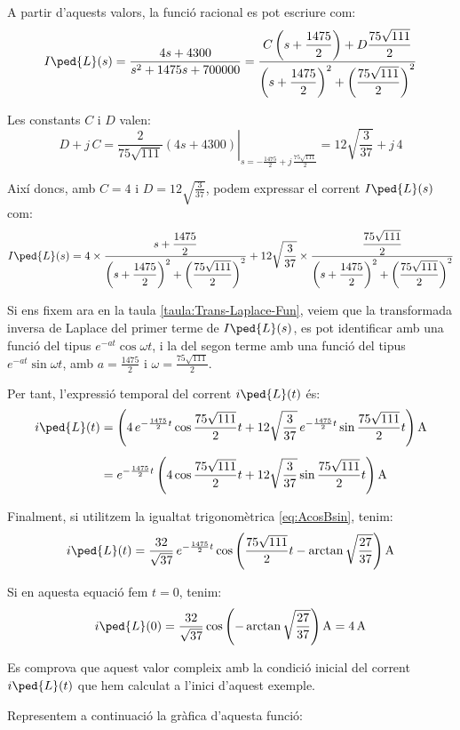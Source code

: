 \begin{exemple}
    A partir d'aquests valors, la  funció racional es pot escriure com:
    \[
        I\ped{L}(s) =
        \frac{4 s+ 4300}{s^2 +1475 s + 700000} =
        \frac{C\left(s+\dfrac{1475}{2}\right)+D\dfrac{75\sqrt{111}}{2}}
        {\left(s+\dfrac{1475}{2}\right)^2+\left(\dfrac{75\sqrt{111}}{2}\right)^2}
    \]

    Les constants $C$ i $D$ valen:
    \[
    D + j\,C = \left.\frac{2}{75\sqrt{111}}(4 s
    +4300)\right|_{s=-\frac{1475}{2} + j\,\frac{75\sqrt{111}}{2}}=
    12\sqrt{\frac{3}{37}} +j\,4
    \]

    Així doncs, amb $C=4$ i $D=12\sqrt{\frac{3}{37}}$, podem expressar
    el corrent $I\ped{L}(s)$ com:
    \[
        I\ped{L}(s) = 4\times\frac{s+\dfrac{1475}{2}}
        {\left(s+\dfrac{1475}{2}\right)^2+\left(\dfrac{75\sqrt{111}}{2}\right)^2}
        + 12\sqrt{\frac{3}{37}}\times\frac{\dfrac{75\sqrt{111}}{2}}
        {\left(s+\dfrac{1475}{2}\right)^2+\left(\dfrac{75\sqrt{111}}{2}\right)^2}
    \]


     Si ens fixem ara en la taula \vref{taula:Trans-Laplace-Fun},
    veiem que la transformada inversa de Laplace del primer terme de
    $I\ped{L}(s)$, es pot identificar amb una funció del tipus
    $e^{-at}\cos\omega t$, i la del segon terme amb una funció del tipus
    $e^{-at}\sin\omega t$, amb $a=\frac{1475}{2}$ i
    $\omega=\frac{75\sqrt{111}}{2}$.

    Per tant, l'expressió temporal del corrent $i\ped{L}(t)$ és:
    \[\begin{split}
        i\ped{L}(t) &= \left( 4\, e^{-\frac{1475}{2}t} \cos \frac{75\sqrt{111}}{2} t +
        12\sqrt{\frac{3}{37}}\, e^{-\frac{1475}{2}t} \sin
        \frac{75\sqrt{111}}{2}t \right) \unit{A} \\[1ex] 
        &= e^{-\frac{1475}{2}t} \left( 4
        \cos \frac{75\sqrt{111}}{2} t + 12\sqrt{\frac{3}{37}}\sin
        \frac{75\sqrt{111}}{2}t\right) \unit{A}
    \end{split}\]

    Finalment, si utilitzem la igualtat trigonomètrica
    \eqref{eq:AcosBsin}, tenim:
    \[
    i\ped{L}(t) = \frac{32}{\sqrt{37}}\,e^{-\frac{1475}{2}t}
    \cos\left(\frac{75\sqrt{111}}{2} t - \arctan
    \sqrt{\frac{27}{37}}\right) \unit{A}
    \]

    Si en aquesta equació fem $t=0$, tenim:
    \[
        i\ped{L}(0) = \frac{32}{\sqrt{37}} \cos\left( - \arctan
    \sqrt{\frac{27}{37}}\right) \unit{A} = \qty{4}{A}
    \]

    Es comprova que aquest valor compleix amb la condició inicial del
    corrent $i\ped{L}(t)$ que hem calculat a l'inici d'aquest exemple.

    Representem a continuació la gràfica d'aquesta funció:

    \begin{center}
        
    \end{center}
\end{exemple}

